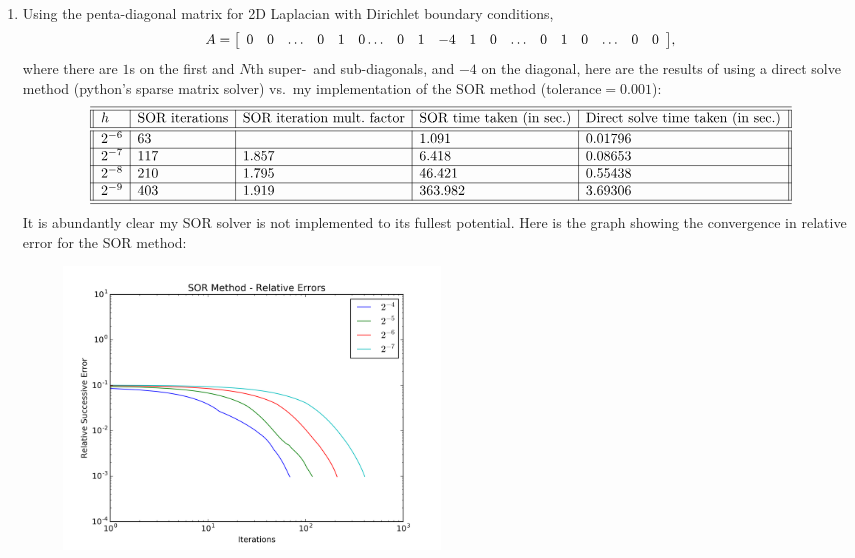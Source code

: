 \documentclass{article} %
\theoremstyle{plain}
\numberwithin{equation}{section} %
\numberwithin{figure}{section} %
\numberwithin{table}{section} %
\begin{document}
\begin{enumerate}[\ \ (a)]
    \item
        Using the penta-diagonal matrix for 2D Laplacian with Dirichlet boundary conditions,
        \begin{align*}
            A = \qty[\begin{array}{ccccccccccccccccccc} 0 & 0 & \dots & 0 & 1 & 0 \dots & 0 & 1 & -4 & 1 & 0 & \dots & 0 & 1 & 0 & \dots & 0 & 0
            \end{array}],
        \end{align*}
        where there are $1$s on the first and $N$th super-~and sub-diagonals, and $-4$ on the diagonal, here are the results of using a direct solve method (python's sparse matrix solver) vs.~my implementation of the SOR method (tolerance$=0.001$):
        \begin{align*}
            \begin{array}{||l|l|l|l|l||}\hline\hline
                h & \text{SOR iterations} & \text{SOR iteration mult.~factor} & \text{SOR time taken (in sec.)} & \text{Direct solve time taken (in sec.)} \\\hline\hline
                2^{-6} & 63 & & 1.091 & 0.01796 \\\hline
                2^{-7} & 117 & 1.857 & 6.418 & 0.08653 \\\hline
                2^{-8} & 210 & 1.795 & 46.421 & 0.55438 \\\hline
                2^{-9} & 403 & 1.919 & 363.982 & 3.69306 \\\hline\hline
            \end{array}
        \end{align*}
        It is abundantly clear my SOR solver is not implemented to its fullest potential.  Here is the graph showing the convergence in relative error for the SOR method:
        \begin{figure}[ht!]
            \centering
            \includegraphics[width=0.5\textwidth]{figure_3_SOR_error_SOR.png}
        \end{figure}
        \FloatBarrier


\end{enumerate}
\end{document}
